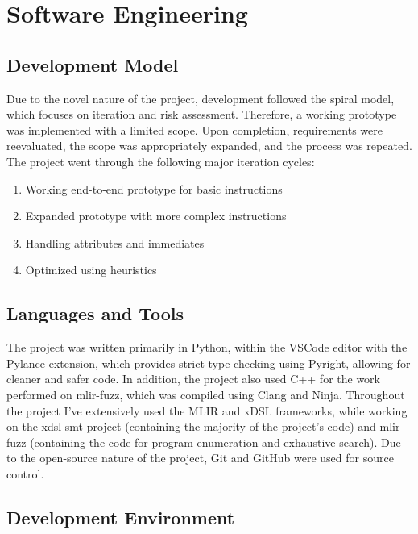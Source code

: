 \section{Software Engineering}

\subsection{Development Model}

Due to the novel nature of the project, development followed the spiral model, which focuses on 
iteration and risk assessment.
%
Therefore, a working prototype was implemented with a limited scope. Upon completion, requirements
were reevaluated, the scope was appropriately expanded, and the process was repeated. 
The project went through the following major iteration cycles:
\begin{enumerate}

\item Working end-to-end prototype for basic instructions

\item Expanded prototype with more complex instructions

\item Handling attributes and immediates

\item Optimized using heuristics
  
\end{enumerate}

\subsection{Languages and Tools}

The project was written primarily in Python, within the VSCode editor with the Pylance extension,
which provides strict type checking using Pyright, allowing for cleaner and safer code. 
In addition, the project also used C++ for the work performed
on mlir-fuzz, which was compiled using Clang and Ninja.
%
Throughout the project I've extensively used the MLIR and xDSL frameworks, while working on the
xdsl-smt project (containing the majority of the project's code) and mlir-fuzz (containing the 
code for program enumeration and exhaustive search).
%
Due to the open-source nature of the project, Git and GitHub were used for source control.

\subsection{Development Environment}


